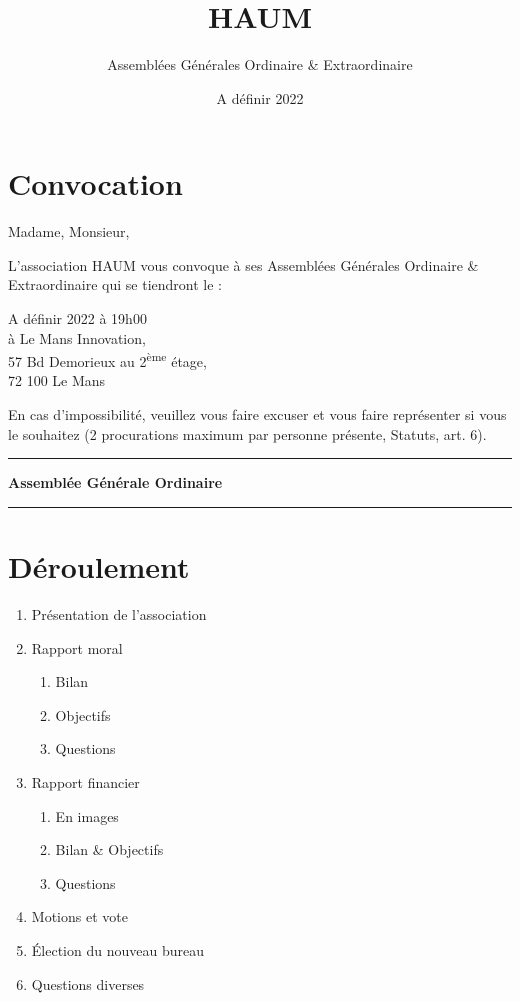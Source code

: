 \documentclass[11pt]{article}
\title{HAUM}
\author{Assemblées Générales Ordinaire \& Extraordinaire}
\date{A définir 2022}
\begin{document}
\maketitle

\section*{Convocation}

Madame, Monsieur,

L'association HAUM vous convoque à ses Assemblées Générales Ordinaire \& Extraordinaire qui se tiendront le :

\begin{center}
{\Large A définir 2022 à 19h00}\\
à Le Mans Innovation, \\57 Bd Demorieux au 2\textsuperscript{ème} étage, \\72 100 Le Mans
\end{center}

En cas d'impossibilité, veuillez vous faire excuser et vous faire représenter si vous le souhaitez (2 procurations maximum par personne présente, Statuts, art. 6).

\newpage

\hrule
\vspace{.6cm}
\begin{center}
\Large\bfseries Assemblée Générale Ordinaire
\end{center}
\vspace{.3cm}
\hrule

\vspace{1.5cm}

\section*{Déroulement}

\begin{enumerate}
    \item Présentation de l'association
    \item Rapport moral
        \begin{enumerate}
            \item Bilan
            \item Objectifs
            \item Questions
        \end{enumerate}
    \item Rapport financier
        \begin{enumerate}
	    \item En images
            \item Bilan \& Objectifs
            \item Questions
        \end{enumerate}
    \item Motions et vote
    \item Élection du nouveau bureau
    \item Questions diverses
\end{enumerate}
\end{document}
